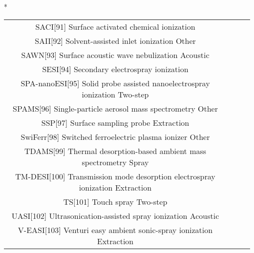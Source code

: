 \begin{table}{*}
\begin{tabular}{|c|c|c|l|}
SACI[91] Surface activated chemical ionization  \\
SAII[92] Solvent-assisted inlet ionization Other \\
SAWN[93] Surface acoustic wave nebulization Acoustic \\
SESI[94] Secondary electrospray ionization  \\
SPA-nanoESI[95] Solid probe assisted nanoelectrospray ionization Two-step \\
SPAMS[96] Single-particle aerosol mass spectrometry Other \\
SSP[97] Surface sampling probe Extraction \\
SwiFerr[98] Switched ferroelectric plasma ionizer Other \\
    TDAMS[99] Thermal desorption-based ambient mass spectrometry Spray \\
    TM-DESI[100] Transmission mode desorption electrospray ionization Extraction \\
    TS[101] Touch spray Two-step \\
    UASI[102] Ultrasonication-assisted spray ionization Acoustic \\
    V-EASI[103] Venturi easy ambient sonic-spray ionization Extraction \\
    \hline \hline 
    \end{tabular} 
\end{table}